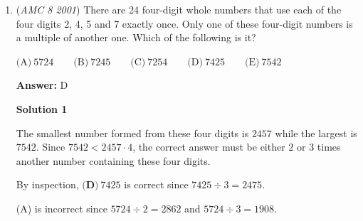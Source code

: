 \begin{enumerate}
$\text{(A)}\ 4 \qquad \text{(B)}\ 5 \qquad \text{(C)}\ 6 \qquad \text{(D)}\ 7 \qquad \text{(E)}\ 9$

 \textbf{Answer: }B



\textbf{Solution}

Each half has $3$ red triangles, $5$ blue triangles, and $8$ white triangles. There are also $2$ pairs of red triangles, so $2$ red triangles on each side are used, leaving $1$ red triangle, $5$ blue triangles, and $8$ white triangles remaining on each half. Also, there are $3$ pairs of blue triangles, using $3$ blue triangles on each side, so there is $1$ red triangle, $2$ blue triangles, and $8$ white triangles remaining on each half. Also, we have $2$ red-white pairs. This obviously can't use $2$ red triangles on one side, since there is only $1$ on each side, so we must use $1$ red triangle and $1$ white triangle per side, leaving $2$ blue triangles and $7$ white triangles apiece. The remaining blue triangles cannot be matched with other blue triangles since that would mean there were more than $3$ blue pairs, so the remaining blue triangles must be paired with white triangles, yielding $4$ blue-white pairs, one for each of the remaining blue triangles. This uses $2$ blue triangles and $2$ white triangles on each side, leaving $5$ white triangles apiece, which must be paired with each other, so there are $5$ white-white pairs, $\boxed{\text{B}}$.

 


	\item (\textit{AMC 8 2001}) There are 24 four-digit whole numbers that use each of the four digits 2, 4, 5 and 7 exactly once. Only one of these four-digit numbers is a multiple of another one. Which of the following is it?


 $\text{(A)}\ 5724 \qquad \text{(B)}\ 7245 \qquad \text{(C)}\ 7254 \qquad \text{(D)}\ 7425 \qquad \text{(E)}\ 7542$

 \textbf{Answer: }D



\textbf{Solution 1}

The smallest number formed from these four digits is $2457$ while the largest is $7542$.  Since $7542 < 2457 \cdot 4$, the correct answer must be either $2$ or $3$ times another number containing these four digits.

 By inspection, $\boxed{\textbf{(D)}\ 7425}$ is correct since $7425 \div 3 = 2475$.

 (A) is incorrect since $5724 \div 2 = 2862$ and $5724 \div 3 = 1908$.


\end{enumerate}
